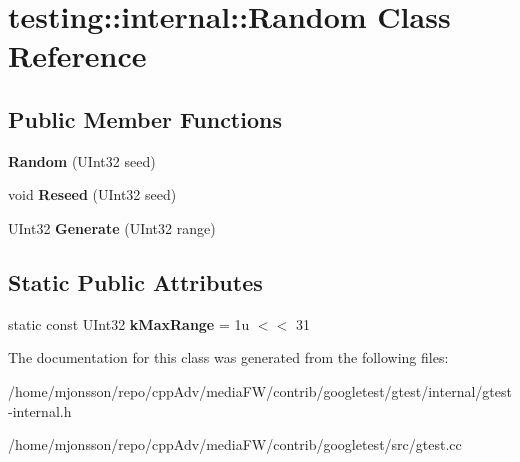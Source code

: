\hypertarget{classtesting_1_1internal_1_1Random}{}\section{testing\+:\+:internal\+:\+:Random Class Reference}
\label{classtesting_1_1internal_1_1Random}
\subsection*{Public Member Functions}
\begin{DoxyCompactItemize}
\item 
\mbox{\label{classtesting_1_1internal_1_1Random_a6e112be5e7cce00551f6383025f69460}} 
{\bfseries Random} (U\+Int32 seed)
\item 
\mbox{\label{classtesting_1_1internal_1_1Random_adf2f24199318a46f885c78f50d89a69e}} 
void {\bfseries Reseed} (U\+Int32 seed)
\item 
\mbox{\label{classtesting_1_1internal_1_1Random_a9315b7fb621cbcfdf92ed4b5e584c0db}} 
U\+Int32 {\bfseries Generate} (U\+Int32 range)
\end{DoxyCompactItemize}
\subsection*{Static Public Attributes}
\begin{DoxyCompactItemize}
\item 
\mbox{\label{classtesting_1_1internal_1_1Random_a36d72dd7063d0b5338f229e75382fdd2}} 
static const U\+Int32 {\bfseries k\+Max\+Range} = 1u $<$$<$ 31
\end{DoxyCompactItemize}


The documentation for this class was generated from the following files\+:\begin{DoxyCompactItemize}
\item 
/home/mjonsson/repo/cpp\+Adv/media\+F\+W/contrib/googletest/gtest/internal/gtest-\/internal.\+h\item 
/home/mjonsson/repo/cpp\+Adv/media\+F\+W/contrib/googletest/src/gtest.\+cc\end{DoxyCompactItemize}
